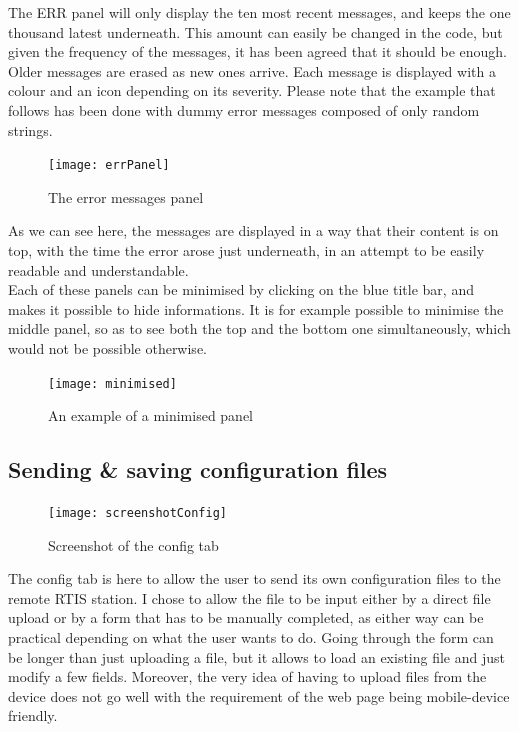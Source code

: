 \documentclass{themeensg}
\begin{document}
The ERR panel will only display the ten most recent messages, and keeps the one thousand latest underneath. This amount can easily be changed in the code, but given the frequency of the messages, it has been agreed that it should be enough. Older messages are erased as new ones arrive. Each message is displayed with a colour and an icon depending on its severity. Please note that the example that follows has been done with dummy error messages composed of only random strings.\\

\begin{figure}[ht]
	\centering
	\texttt{[image: errPanel]}
	\caption{The error messages panel}
\end{figure}

As we can see here, the messages are displayed in a way that their content is on top, with the time the error arose just underneath, in an attempt to be easily readable and understandable.\\

Each of these panels can be minimised by clicking on the blue title bar, and makes it possible to hide informations. It is for example possible to minimise the middle panel, so as to see both the top and the bottom one simultaneously, which would not be possible otherwise.\\

\begin{figure}[hb]
	\centering
	\texttt{[image: minimised]}
	\caption{An example of a minimised panel}
\end{figure}


\newpage
\subsection{Sending \& saving configuration files}

\begin{figure}[ht]
	\centering
	\texttt{[image: screenshotConfig]}
	\caption{Screenshot of the config tab}
\end{figure}


The config tab is here to allow the user to send its own configuration files to the remote RTIS station. I chose to allow the file to be input either by a direct file upload or by a form that has to be manually completed, as either way can be practical depending on what the user wants to do. Going through the form can be longer than just uploading a file, but it allows to load an existing file and just modify a few fields. Moreover, the very idea of having to upload files from the device does not go well with the requirement of the web page being mobile-device friendly.\\
\end{document}
